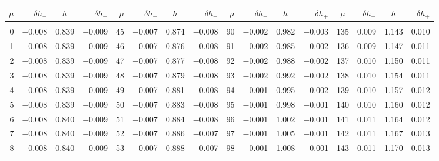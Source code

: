 \clearpage
\begin{table}[!h]\centering
\vspace{0.25cm}
\scriptsize{ \begin{tabular}{rrrr|rrrr|rrrr|crrr}
$\mu$ & $\delta h_-$  & $\bar{h}~~~~$ & $\delta h_+$ &
$\mu$ & $\delta h_-$  & $\bar{h}~~~~$ & $\delta h_+$ &
$\mu$ & $\delta h_-$  & $\bar{h}~~~~$ & $\delta h_+$ &
$\mu$ & $\delta h_-$  & $\bar{h}~~~~$ & $\delta h_+$ \\\hline
&&&&&&&&&&&&&&&\\[-1.75ex]
  0 & \tiny{ $-$0.008} &   0.839 & \tiny{ $-$0.009} &  45 & \tiny{ $-$0.007} &   0.874 & \tiny{ $-$0.008} &  90 & \tiny{ $-$0.002} &   0.982 & \tiny{ $-$0.003} & 135 & \tiny{  0.009} &   1.143 & \tiny{  0.010}\\
  1 & \tiny{ $-$0.008} &   0.839 & \tiny{ $-$0.009} &  46 & \tiny{ $-$0.007} &   0.876 & \tiny{ $-$0.008} &  91 & \tiny{ $-$0.002} &   0.985 & \tiny{ $-$0.002} & 136 & \tiny{  0.009} &   1.147 & \tiny{  0.011}\\
  2 & \tiny{ $-$0.008} &   0.839 & \tiny{ $-$0.009} &  47 & \tiny{ $-$0.007} &   0.877 & \tiny{ $-$0.008} &  92 & \tiny{ $-$0.002} &   0.988 & \tiny{ $-$0.002} & 137 & \tiny{  0.010} &   1.150 & \tiny{  0.011}\\
  3 & \tiny{ $-$0.008} &   0.839 & \tiny{ $-$0.009} &  48 & \tiny{ $-$0.007} &   0.879 & \tiny{ $-$0.008} &  93 & \tiny{ $-$0.002} &   0.992 & \tiny{ $-$0.002} & 138 & \tiny{  0.010} &   1.154 & \tiny{  0.011}\\
  4 & \tiny{ $-$0.008} &   0.839 & \tiny{ $-$0.009} &  49 & \tiny{ $-$0.007} &   0.881 & \tiny{ $-$0.008} &  94 & \tiny{ $-$0.001} &   0.995 & \tiny{ $-$0.002} & 139 & \tiny{  0.010} &   1.157 & \tiny{  0.012}\\
  5 & \tiny{ $-$0.008} &   0.839 & \tiny{ $-$0.009} &  50 & \tiny{ $-$0.007} &   0.883 & \tiny{ $-$0.008} &  95 & \tiny{ $-$0.001} &   0.998 & \tiny{ $-$0.001} & 140 & \tiny{  0.010} &   1.160 & \tiny{  0.012}\\
  6 & \tiny{ $-$0.008} &   0.840 & \tiny{ $-$0.009} &  51 & \tiny{ $-$0.007} &   0.884 & \tiny{ $-$0.008} &  96 & \tiny{ $-$0.001} &   1.002 & \tiny{ $-$0.001} & 141 & \tiny{  0.011} &   1.164 & \tiny{  0.012}\\
  7 & \tiny{ $-$0.008} &   0.840 & \tiny{ $-$0.009} &  52 & \tiny{ $-$0.007} &   0.886 & \tiny{ $-$0.007} &  97 & \tiny{ $-$0.001} &   1.005 & \tiny{ $-$0.001} & 142 & \tiny{  0.011} &   1.167 & \tiny{  0.013}\\
  8 & \tiny{ $-$0.008} &   0.840 & \tiny{ $-$0.009} &  53 & \tiny{ $-$0.007} &   0.888 & \tiny{ $-$0.007} &  98 & \tiny{ $-$0.001} &   1.008 & \tiny{ $-$0.001} & 143 & \tiny{  0.011} &   1.170 & \tiny{  0.013}\\

\end{tabular}}
\end{table}

